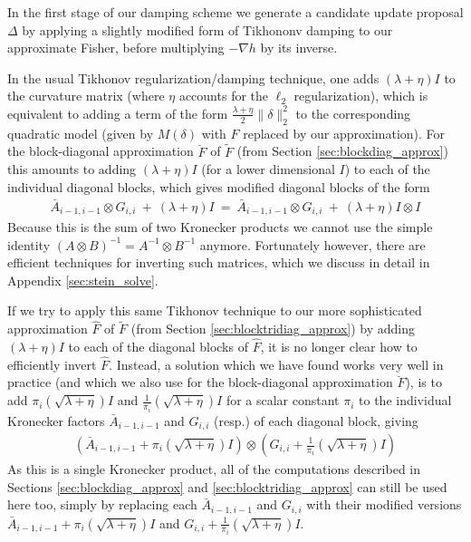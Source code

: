 \documentclass[12pt]{article}
\begin{document}
In the first stage of our damping scheme we generate a candidate update proposal $\Delta$ by applying a slightly modified form of Tikhononv damping to our approximate Fisher, before multiplying $-\nabla h$ by its inverse.

In the usual Tikhonov regularization/damping technique, one adds $(\lambda + \eta) I$ to the curvature matrix (where $\eta$ accounts for the $\ell_2$ regularization), which is equivalent to adding a term of the form $\displaystyle \frac{\lambda + \eta}{2} \| \delta \|_2^2$ to the corresponding quadratic model (given by $M(\delta)$ with $F$ replaced by our approximation).  For the block-diagonal approximation $\breve{F}$ of $\tilde{F}$ (from Section \ref{sec:blockdiag_approx}) this amounts to adding $(\lambda + \eta)I$ (for a lower dimensional $I$) to each of the individual diagonal blocks, which gives modified diagonal blocks of the form
\begin{align}
\label{eqn:exact_tik}
\bar{A}_{i-1,i-1} \otimes G_{i,i} \:+\: (\lambda + \eta) I \:=\: \bar{A}_{i-1,i-1} \otimes G_{i,i} \:+\: (\lambda + \eta) I \otimes I
\end{align}
Because this is the sum of two Kronecker products we cannot use the simple identity $(A \otimes B)^{-1} = A^{-1} \otimes B^{-1}$ anymore.  Fortunately however, there are efficient techniques for inverting such matrices, which we discuss in detail in Appendix \ref{sec:stein_solve}.

If we try to apply this same Tikhonov technique to our more sophisticated approximation $\hat{F}$ of $\tilde{F}$ (from Section \ref{sec:blocktridiag_approx}) by adding $(\lambda + \eta) I$ to each of the diagonal blocks of $\hat{F}$, it is no longer clear how to efficiently invert $\hat{F}$.  Instead, a solution which we have found works very well in practice (and which we also use for the block-diagonal approximation $\breve{F}$), is to add $\pi_i (\sqrt{\lambda + \eta}) I$ and $\displaystyle \frac{1}{\pi_i} (\sqrt{\lambda + \eta}) I$ for a scalar constant $\pi_i$ to the individual Kronecker factors $\bar{A}_{i-1,i-1}$ and $G_{i,i}$ (resp.) of each diagonal block, giving
\begin{align}
\label{eqn:approx_tik}
\left (\bar{A}_{i-1,i-1} + \pi_i (\sqrt{\lambda + \eta}) I \right) \otimes \left (G_{i,i} + \frac{1}{\pi_i} (\sqrt{\lambda + \eta}) I \right)
\end{align}
As this is a single Kronecker product, all of the computations described in Sections \ref{sec:blockdiag_approx} and \ref{sec:blocktridiag_approx} can still be used here too, simply by replacing each $\bar{A}_{i-1,i-1}$ and $G_{i,i}$ with their modified versions $\bar{A}_{i-1,i-1} + \pi_i (\sqrt{\lambda + \eta}) I$ and $\displaystyle G_{i,i} + \frac{1}{\pi_i} (\sqrt{\lambda + \eta}) I$.
\end{document}
